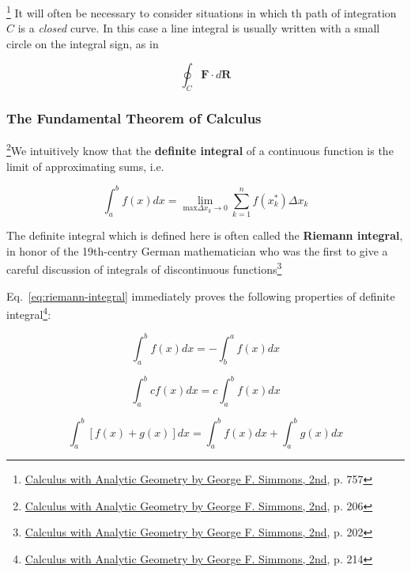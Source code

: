 \begin{tcolorbox}[enhanced,arc=3mm,boxrule=1.5mm,
    frame hidden,colback=blue!10!white,
    borderline={1mm}{0mm}{blue,dotted}
]
    \footnote{\href{https://trello.com/c/byu9Pyy8}{Calculus with Analytic Geometry by George F. Simmons, 2nd}, p. 757} It
    will often be necessary to consider situations in which th path of integration $C$ is a \textit{closed} curve. In this
    case a line integral is usually written with a small circle on the integral sign, as in

    \[
        \oint_{C} \boldsymbol{F} \cdot d\boldsymbol{R}
    \]
\end{tcolorbox}

\subsubsection{The Fundamental Theorem of Calculus}

\footnote{\href{https://trello.com/c/byu9Pyy8}{Calculus with Analytic Geometry by George F. Simmons, 2nd}, p. 206}We
intuitively know that the \textbf{definite integral} of a continuous function is the limit of approximating sums, i.e.

\begin{equation}\label{eq:riemann-integral}
    \int_{a}^{b} f(x)dx = \lim\limits_{\text{max}\Delta x_k \rightarrow 0}\sum_{k = 1}^{n} f(x_k^*)\Delta x_k
\end{equation}

The definite integral which is defined here is often called the \textbf{Riemann integral}, in honor of the 19th-centry
German mathematician who was the first to give a careful discussion of integrals of discontinuous
functions\footnote{\href{https://trello.com/c/byu9Pyy8}{Calculus with Analytic Geometry by George F. Simmons, 2nd}, p. 202}

Eq.~\ref{eq:riemann-integral} immediately proves the following properties of definite integral\footnote{\href{https://trello.com/c/byu9Pyy8}{Calculus with Analytic Geometry by George F. Simmons, 2nd}, p. 214}:

\begin{equation}\label{eq:definite-integral-reverse}
    \int_a^b f(x)dx = -\int_b^a f(x)dx
\end{equation}

\begin{equation}
    \int_a^b cf(x)dx = c\int_a^b f(x)dx
\end{equation}

\begin{equation}
    \int_a^b [f(x) + g(x)]dx = \int_a^b f(x)dx + \int_a^b g(x)dx
\end{equation}


